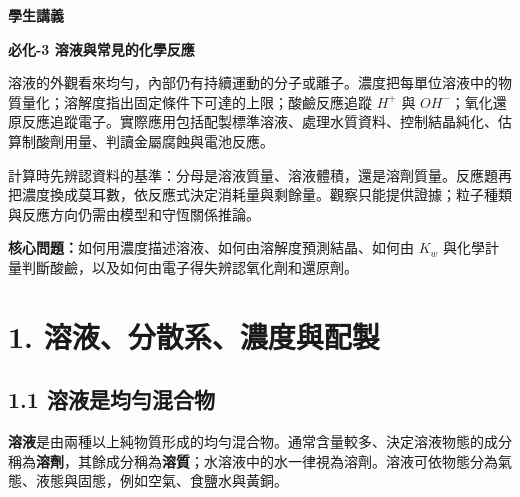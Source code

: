 \documentclass[11pt,a4paper]{article}
\begin{document}
\begin{tcolorbox}[
  enhanced,colback=white,colframe=HandoutBlue,boxrule=1.1pt,arc=2mm,
  borderline west={3pt}{0pt}{HandoutBlue},left=5mm,right=4mm,top=4mm,bottom=4mm
]
{\sffamily\small\bfseries\color{HandoutBlue}學生講義}\par
{\sffamily\bfseries\LARGE\color{HandoutInk}必化-3 溶液與常見的化學反應}\par
\vspace{0.35em}{\large 由粒子分布與定量資料判斷溶液組成、溶解平衡、酸鹼與電子轉移}\par
{}\par
{}\par
\end{tcolorbox}


溶液的外觀看來均勻，內部仍有持續運動的分子或離子。濃度把每單位溶液中的物質量化；溶解度指出固定條件下可達的上限；酸鹼反應追蹤 \(H^+\) 與 \(OH^-\)；氧化還原反應追蹤電子。實際應用包括配製標準溶液、處理水質資料、控制結晶純化、估算制酸劑用量、判讀金屬腐蝕與電池反應。

計算時先辨認資料的基準：分母是溶液質量、溶液體積，還是溶劑質量。反應題再把濃度換成莫耳數，依反應式決定消耗量與剩餘量。觀察只能提供證據；粒子種類與反應方向仍需由模型和守恆關係推論。

\textbf{核心問題：}如何用濃度描述溶液、如何由溶解度預測結晶、如何由 \(K_w\) 與化學計量判斷酸鹼，以及如何由電子得失辨認氧化劑和還原劑。

\section{1. 溶液、分散系、濃度與配製}\label{ux6eb6ux6db2ux5206ux6563ux7cfbux6fc3ux5ea6ux8207ux914dux88fd}

\subsection{1.1 溶液是均勻混合物}\label{ux6eb6ux6db2ux662fux5747ux52fbux6df7ux5408ux7269}

\textbf{溶液}是由兩種以上純物質形成的均勻混合物。通常含量較多、決定溶液物態的成分稱為\textbf{溶劑}，其餘成分稱為\textbf{溶質}；水溶液中的水一律視為溶劑。溶液可依物態分為氣態、液態與固態，例如空氣、食鹽水與黃銅。
\end{document}
